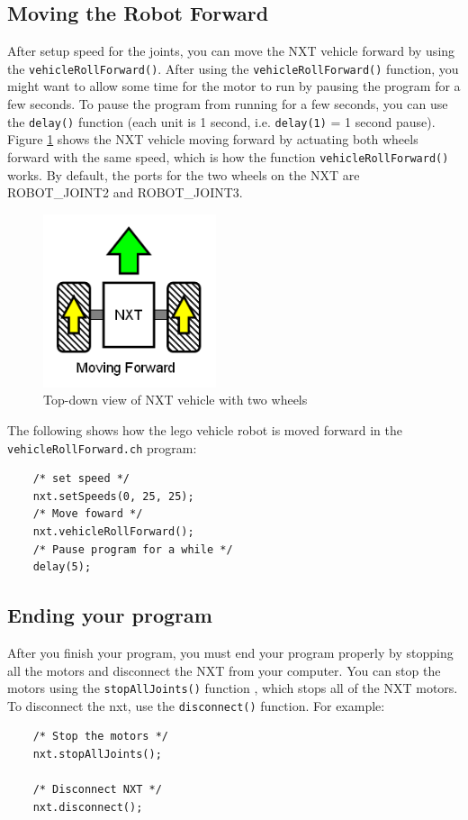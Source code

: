 \subsection{Moving the Robot Forward}
After setup speed for the joints, you can move the NXT vehicle forward by using the 
\verb+vehicleRollForward()+. After using the \verb+vehicleRollForward()+ function, you might want to 
allow some time for the motor to run by pausing the program for a few seconds. To pause the program 
from running for a few seconds, you can use the \verb+delay()+ function (each unit is 1 second, i.e. 
\verb+delay(1)+ = 1 second pause). Figure \ref{fig_NXT_forward} shows the NXT vehicle moving forward 
by actuating both wheels forward with the same speed, which is how the function \verb+vehicleRollForward()+ works. 
By default, the ports for the two wheels on the NXT are ROBOT\_JOINT2 and ROBOT\_JOINT3.\\
\begin{figure}[h]
  \begin{center}
    \includegraphics[height=2in]{figure/mindstorm/Vehicle_forward.png}
    \caption{Top-down view of NXT vehicle with two wheels\label{fig_NXT_forward}}
  \end{center}
\end{figure}
\noindent
The following shows how the lego vehicle robot is moved forward in the \verb+vehicleRollForward.ch+ 
program:
\begin{verbatim}
    /* set speed */
    nxt.setSpeeds(0, 25, 25);
    /* Move foward */
    nxt.vehicleRollForward();
    /* Pause program for a while */
    delay(5);
\end{verbatim}

\subsection{Ending your program}
After you finish your program, you must end your program properly by stopping all the motors and 
disconnect the NXT from your computer. You can stop the motors using the \verb+stopAllJoints()+ function
, which stops all of the NXT motors. To disconnect the nxt, use the \verb+disconnect()+ function. For
example:
\begin{verbatim}
    /* Stop the motors */
    nxt.stopAllJoints();
    
    /* Disconnect NXT */
    nxt.disconnect();
\end{verbatim}


